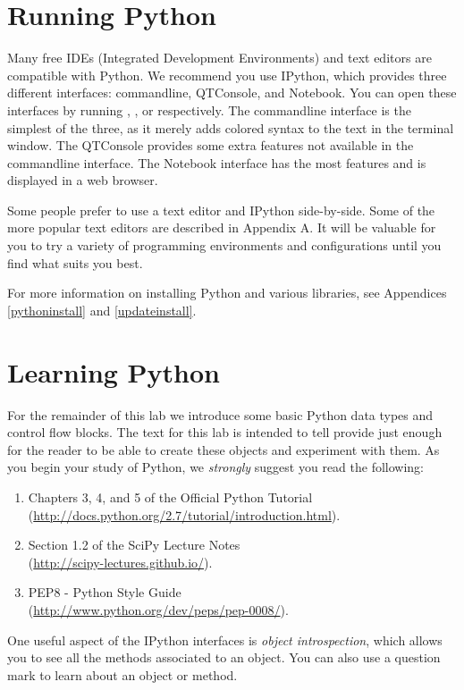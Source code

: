 \section*{Running Python}
Many free IDEs (Integrated Development Environments) and text editors are compatible with Python. We recommend you use IPython, which provides three different interfaces: commandline, QTConsole, and Notebook. You can open these interfaces by running , , or  respectively.
The commandline interface is the simplest of the three, as it merely adds colored syntax to the text in the terminal window.
The QTConsole provides some extra features not available in the commandline interface.
The Notebook interface has the most features and is displayed in a web browser.

Some people prefer to use a text editor and IPython side-by-side. Some of the more popular text editors are described in Appendix A. It will be valuable for you to try a variety of programming environments and configurations until you find what suits you best.

For more information on installing Python and various libraries, see Appendices \ref{pythoninstall} and \ref{updateinstall}.

\section*{Learning Python}
For the remainder of this lab we introduce some basic Python data types and control flow blocks. The text for this lab is intended to tell provide just enough for the reader to be able to create these objects and experiment with them. As you begin your study of Python, we \emph{strongly} suggest you read the following:
\begin{enumerate}
\item Chapters 3, 4, and 5 of the Official Python Tutorial \\
        (\url{http://docs.python.org/2.7/tutorial/introduction.html}).
\item Section 1.2 of the SciPy Lecture Notes\\
        (\url{http://scipy-lectures.github.io/}).
\item PEP8 - Python Style Guide \\
        (\url{http://www.python.org/dev/peps/pep-0008/}).
\end{enumerate}

One useful aspect of the IPython interfaces is \emph{object introspection}, which allows you to see all the methods associated to an object. You can also use a question mark to learn about an object or method.

